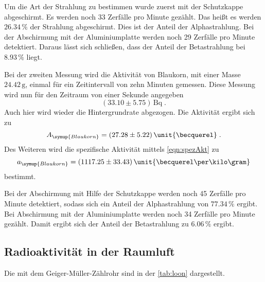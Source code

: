 Um die Art der Strahlung zu bestimmen wurde zuerst mit der Schutzkappe abgeschirmt. Es werden noch 33 Zerfälle pro Minute gezählt. Das heißt es werden
$26.34 \, \%$ der Strahlung abgeschirmt. Dies ist der Anteil der Alphastrahlung. Bei der Abschirmung mit der Aluminiumplatte werden noch 29 
Zerfälle pro Minute detektiert. Daraus lässt sich schließen, dass der Anteil der Betastrahlung bei $8.93 \,\%$ liegt.

Bei der zweiten Messung wird die Aktivität von Blaukorn, mit einer Masse $24.42\,\unit{\gram}$, einmal für ein Zeitintervall von zehn Minuten gemessen.
Diese Messung wird nun für den Zeitraum von einer Sekunde angegeben
\begin{equation*}
    (33.10 \pm 5.75) \,\unit{\becquerel} \; .
\end{equation*}
Auch hier wird wieder die Hintergrundrate abgezogen. Die Aktivität ergibt sich zu 
\begin{equation*}
    A_{\symup{Blaukorn}} = (27.28 \pm 5.22) \, \unit{\becquerel} \; .
\end{equation*}
Des Weiteren wird die spezifische Aktivität mittels \autoref{eqn:spezAkt} zu 
\begin{equation*}
    a_{\symup{Blaukorn}} = (1117.25 \pm 33.43) \,\unit{\becquerel \per \kilo\gram}
\end{equation*} 
bestimmt. 

Bei der Abschirmung mit Hilfe der Schutzkappe werden noch 45 Zerfälle pro Minute detektiert, sodass sich ein Anteil der Alphastrahlung von $77.34 \,\%$ 
ergibt. Bei Abschirmung mit der Aluminiumplatte werden noch 34 Zerfälle pro Minute gezählt. Damit ergibt sich der Anteil der Betastrahlung zu 
$6.06 \,\%$ ergibt.

\subsection{Radioaktivität in der Raumluft}
\label{sec:Radioaktivität in der Raumluft}

Die mit dem Geiger-Müller-Zählrohr sind in der \autoref{tab:loon} dargestellt.

